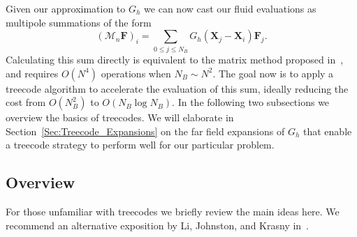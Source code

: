 \documentclass[preprint,12pt]{elsarticle}
\newcommand{\B}[1]{\mathbf{#1}}
\newcommand{\C}[1]{\mathcal{#1}}
\begin{document}
Given our approximation to $G_h$ we can now cast
our fluid evaluations as multipole summations of the form
\begin{equation}
(\C{M}_n\B{F})_i = \sum_{0\leq j\leq N_B} G_h(\B{X}_j - \B{X}_i) \B{F}_j.
\label{eq:IBMultipole}
\end{equation}
Calculating this sum directly is equivalent to the matrix method proposed in~\cite{IBM_Implicit2D}, and requires $O(N^4)$ operations when $N_B\sim N^2$.
The goal now is to apply a treecode algorithm to accelerate the evaluation of this sum, ideally reducing the cost from $O(N_B^2)$ to $O(N_B\log N_B)$. In the following two subsections we overview the basics of treecodes. We will elaborate in Section~\ref{Sec:Treecode_Expansions} on the far field expansions of $G_h$ that enable a treecode strategy to perform well for our particular problem.

\subsection{Overview}
For those unfamiliar with treecodes we briefly review the main ideas here. We recommend an alternative  exposition by Li, Johnston, and Krasny in~\cite{TreeCode_Krasny}.
\end{document}
